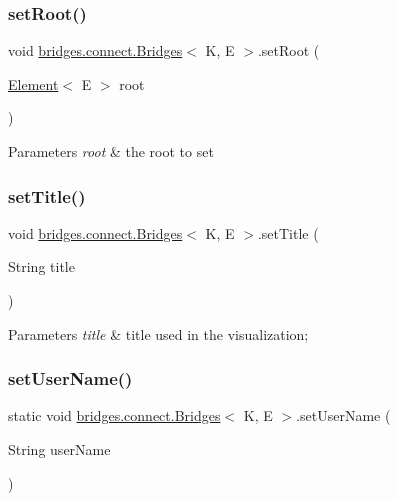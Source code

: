 \subsubsection{\texorpdfstring{set\+Root()}{setRoot()}}
{\footnotesize\ttfamily void \hyperlink{classbridges_1_1connect_1_1_bridges}{bridges.\+connect.\+Bridges}$<$ K, E $>$.set\+Root (\begin{DoxyParamCaption}\item[{\hyperlink{classbridges_1_1base_1_1_element}{Element}$<$ E $>$}]{root }\end{DoxyParamCaption})}


\begin{DoxyParams}{Parameters}
{\em root} & the root to set \\
\hline
\end{DoxyParams}
\hypertarget{classbridges_1_1connect_1_1_bridges_a90c7f6b2b99d88bf241ea7247db47045}{}\label{classbridges_1_1connect_1_1_bridges_a90c7f6b2b99d88bf241ea7247db47045} 
\subsubsection{\texorpdfstring{set\+Title()}{setTitle()}}
{\footnotesize\ttfamily void \hyperlink{classbridges_1_1connect_1_1_bridges}{bridges.\+connect.\+Bridges}$<$ K, E $>$.set\+Title (\begin{DoxyParamCaption}\item[{String}]{title }\end{DoxyParamCaption})}


\begin{DoxyParams}{Parameters}
{\em title} & title used in the visualization; \\
\hline
\end{DoxyParams}
\hypertarget{classbridges_1_1connect_1_1_bridges_a2d84103645662308e58a1b473d3320ae}{}\label{classbridges_1_1connect_1_1_bridges_a2d84103645662308e58a1b473d3320ae} 
\subsubsection{\texorpdfstring{set\+User\+Name()}{setUserName()}}
{\footnotesize\ttfamily static void \hyperlink{classbridges_1_1connect_1_1_bridges}{bridges.\+connect.\+Bridges}$<$ K, E $>$.set\+User\+Name (\begin{DoxyParamCaption}\item[{String}]{user\+Name }\end{DoxyParamCaption})\hspace{0.3cm}{\ttfamily [static]}}

